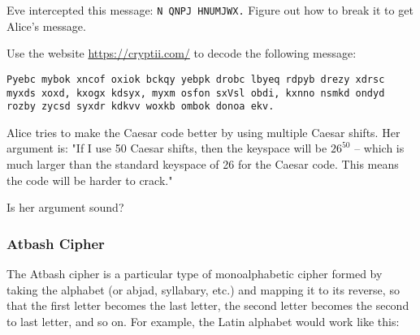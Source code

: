 \documentclass[11pt,a4paper]{report}
\begin{document}
\begin{ex}
Eve intercepted this message: \verb|N QNPJ HNUMJWX.| Figure out how to break it to get Alice’s message.
\end{ex}


\begin{ex}
Use the website \url{https://cryptii.com/} to decode the following message:
\begin{verbatim}
Pyebc mybok xncof oxiok bckqy yebpk drobc lbyeq rdpyb drezy xdrsc
myxds xoxd, kxogx kdsyx, myxm osfon sxVsl obdi, kxnno nsmkd ondyd
rozby zycsd syxdr kdkvv woxkb ombok donoa ekv.
\end{verbatim}
\end{ex}

\begin{ex}
Alice tries to make the Caesar code better by using multiple Caesar shifts. Her argument is: "If I use 50 Caesar shifts,  then the keyspace will be $26^{50}$ -- which is much larger than the standard keyspace of 26 for the Caesar code.  This means the code will be harder to crack." 

Is her argument sound?
\end{ex}

\subsubsection{Atbash Cipher}

The Atbash cipher is a particular type of monoalphabetic cipher formed by taking the alphabet (or abjad, syllabary, etc.) and mapping it to its reverse, so that the first letter becomes the last letter, the second letter becomes the second to last letter, and so on. For example, the Latin alphabet would work like this:
\end{document}
